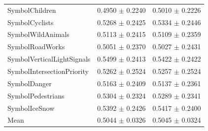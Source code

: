\begin{longtable}{@{}lrr@{}}
SymbolChildren & 0.4950 $\pm$ 0.2240 & 0.5010 $\pm$ 0.2226 \\
SymbolCyclists & 0.5268 $\pm$ 0.2425 & 0.5334 $\pm$ 0.2446 \\
SymbolWildAnimals & 0.5113 $\pm$ 0.2415 & 0.5109 $\pm$ 0.2359 \\
SymbolRoadWorks & 0.5051 $\pm$ 0.2370 & 0.5027 $\pm$ 0.2431 \\
SymbolVerticalLightSignals & 0.5499 $\pm$ 0.2413 & 0.5422 $\pm$ 0.2422 \\
SymbolIntersectionPriority & 0.5262 $\pm$ 0.2524 & 0.5257 $\pm$ 0.2524 \\
SymbolDanger & 0.5163 $\pm$ 0.2409 & 0.5137 $\pm$ 0.2361 \\
SymbolPedestrians & 0.5304 $\pm$ 0.2324 & 0.5289 $\pm$ 0.2341 \\
SymbolIceSnow & 0.5392 $\pm$ 0.2426 & 0.5417 $\pm$ 0.2400 \\
Mean & 0.5044 $\pm$ 0.0326 & 0.5045 $\pm$ 0.0324 \\
\end{longtable}
